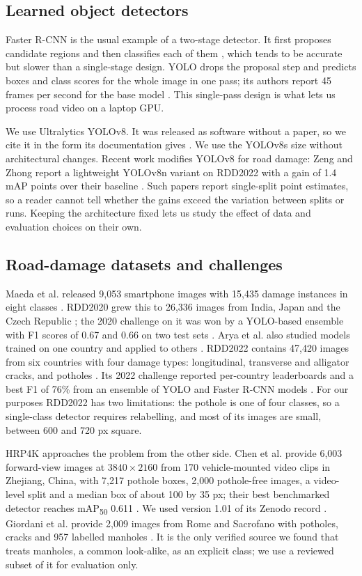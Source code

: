 \subsection{Learned object detectors}
Faster R-CNN is the usual example of a two-stage detector. It first proposes candidate regions and then classifies each of them \cite{ren2017faster}, which tends to be accurate but slower than a single-stage design. YOLO drops the proposal step and predicts boxes and class scores for the whole image in one pass; its authors report 45 frames per second for the base model \cite{redmon2016yolo}. This single-pass design is what lets us process road video on a laptop GPU.

We use Ultralytics YOLOv8. It was released as software without a paper, so we cite it in the form its documentation gives \cite{jocher2023yolov8}. We use the YOLOv8s size without architectural changes. Recent work modifies YOLOv8 for road damage: Zeng and Zhong report a lightweight YOLOv8n variant on RDD2022 with a gain of 1.4 mAP points over their baseline \cite{zeng2024yolov8pd}. Such papers report single-split point estimates, so a reader cannot tell whether the gains exceed the variation between splits or runs. Keeping the architecture fixed lets us study the effect of data and evaluation choices on their own.

\subsection{Road-damage datasets and challenges}
Maeda et al. released 9,053 smartphone images with 15,435 damage instances in eight classes \cite{maeda2018road}. RDD2020 grew this to 26,336 images from India, Japan and the Czech Republic \cite{arya2021rdd2020}; the 2020 challenge on it was won by a YOLO-based ensemble with F1 scores of 0.67 and 0.66 on two test sets \cite{arya2020grddc}. Arya et al. also studied models trained on one country and applied to others \cite{arya2021multicountry}. RDD2022 contains 47,420 images from six countries with four damage types: longitudinal, transverse and alligator cracks, and potholes \cite{arya2022rdd2022}. Its 2022 challenge reported per-country leaderboards and a best F1 of 76\% from an ensemble of YOLO and Faster R-CNN models \cite{arya2022crddc}. For our purposes RDD2022 has two limitations: the pothole is one of four classes, so a single-class detector requires relabelling, and most of its images are small, between 600 and 720 px square.

HRP4K approaches the problem from the other side. Chen et al. provide 6,003 forward-view images at $3840 \times 2160$ from 170 vehicle-mounted video clips in Zhejiang, China, with 7,217 pothole boxes, 2,000 pothole-free images, a video-level split and a median box of about 100 by 35 px; their best benchmarked detector reaches mAP\textsubscript{50} 0.611 \cite{chen2026hrp4k}. We used version 1.01 of its Zenodo record \cite{chen2026hrp4kzenodo}. Giordani et al. provide 2,009 images from Rome and Sacrofano with potholes, cracks and 957 labelled manholes \cite{giordani2026roaddamage}. It is the only verified source we found that treats manholes, a common look-alike, as an explicit class; we use a reviewed subset of it for evaluation only.

